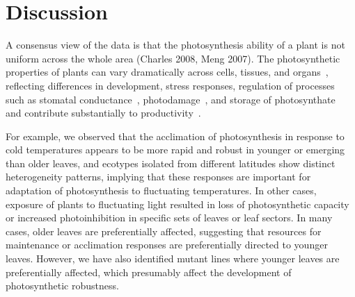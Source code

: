 {%



\section*{Discussion}

A consensus view of the data is that the photosynthesis ability of a plant is not uniform across the whole area (Charles 2008, Meng 2007).
%
The photosynthetic properties of plants can vary dramatically across cells, tissues, and organs~\cite{}, reflecting differences in development, stress responses, regulation of processes such as stomatal conductance~\cite{}, photodamage~\cite{}, and storage of photosynthate~\cite{} and contribute substantially to productivity~\cite{}.

For example, we observed that the acclimation of photosynthesis in response to cold temperatures appears to be more rapid and robust in younger or emerging than older leaves, and ecotypes isolated from different latitudes show distinct heterogeneity patterns, implying that these responses are important for adaptation of photosynthesis to fluctuating temperatures.
%
In other cases, exposure of plants to fluctuating light resulted in loss of photosynthetic capacity or increased photoinhibition in specific sets of leaves or leaf sectors. In many cases, older leaves are preferentially affected, suggesting that resources for maintenance or acclimation responses are preferentially directed to younger leaves. However, we have also identified mutant lines where younger leaves are preferentially affected, which presumably affect the development of photosynthetic robustness.

}
